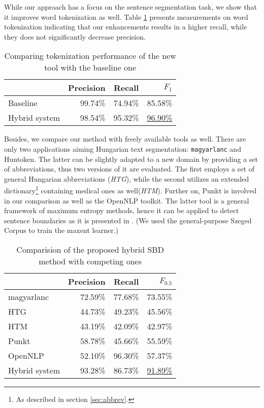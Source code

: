 While our approach has a focus on the sentence segmentation task, we show that it improves word tokenization as well. 
Table \ref{tab:tok_eval} presents measurements on word tokenization indicating that our enhancements results in a higher recall, while they does not significantly decrease precision. \label{sec:eval}

\begin{table}[h]
\centering
\caption{Comparing tokenization performance of the new tool with the baseline one}
\label{tab:tok_eval}
\begin{tabular}{ l r r r} 
\hline
& Precision & Recall & $F_{1}$ \\
\hline
Baseline & 99.74\% & 74.94\% & 85.58\%  \\
Hybrid system & 98.54\% & 95.32\% & \underline{96.90\%} \\
\hline
\end{tabular}
\end{table}

Besides, we compare our method with freely available tools as well.
There are only two applications aiming Hungarian text segmentation: \texttt{magyarlanc} and Huntoken.
The latter can be slightly adapted to a new domain by providing a set of abbreviations, thus two versions of it are evaluated. 
The first employs a set of general Hungarian abbreviations (\emph{HTG}), while the second utilizes an extended dictionary\footnote{As described in section \ref{sec:abbrev}.} containing medical ones as well(\emph{HTM}). 
Further on, Punkt \cite{kiss2006unsupervised} is involved in our comparison as well as the OpenNLP \cite{Baldridge2002} toolkit. 
The latter tool is a general framework of maximum entropy methods, hence it can be applied to detect sentence boundaries as it is presented in \cite{reynar1997maximum}.
(We used the general-purpose Szeged Corpus to train the maxent learner.) 

\begin{table}[h]
\centering
\caption{Comparision of the proposed hybrid SBD method with competing ones}
\label{tab:comparison}
\begin{tabular}{ l r r r} 
\hline
& Precision & Recall & $F_{0.5}$ \\
\hline
magyarlanc & 72.59\% & 77.68\% & 73.55\% \\
HTG & 44.73\% & 49.23\% & 45.56\% \\
HTM & 43.19\% & 42.09\% & 42.97\% \\
Punkt & 58.78\% & 45.66\% & 55.59\%  \\
OpenNLP & 52.10\% & 96.30\% & 57.37\% \\
Hybrid system & 93.28\% & 86.73\% & \underline{91.89\%} \\
\hline
\end{tabular}
\end{table}

